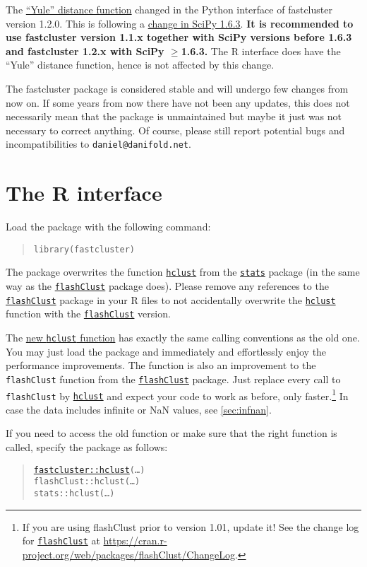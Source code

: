 \documentclass[fontsize=10pt,paper=letter,BCOR=-6mm,DIV=8]{scrartcl}
\newcommand*\q{\textquotesingle}
\newcommand*\hclust{\href{https://stat.ethz.ch/R-manual/R-patched/library/stats/html/hclust.html}{\texttt{hclust}}}
\newcommand*\stats{\href{https://stat.ethz.ch/R-manual/R-patched/library/stats/html/00Index.html}{\texttt{stats}}}
\newcommand*\flashClustPack{\href{https://CRAN.R-project.org/package=flashClust}{\texttt{flashClust}}}
\begin{document}
The \hyperref[yule]{“Yule” distance function} changed in the Python interface of fastcluster version 1.2.0. This is following a \href{https://github.com/scipy/scipy/commit/3b22d1da98dc1b5f64bc944c21f398d4ba782bce}{change in SciPy 1.6.3}. \textbf{It is recommended to use fastcluster version 1.1.x together with SciPy versions before 1.6.3 and fastcluster 1.2.x with SciPy $\geq{}$1.6.3.} The R interface does have the “Yule” distance function, hence is not affected by this change.

The fastcluster package is considered stable and will undergo few changes from now on. If some years from now there have not been any updates, this does not necessarily mean that the package is unmaintained but maybe it just was not necessary to correct anything. Of course, please still report potential bugs and incompatibilities to \texttt{daniel@danifold.net}.

\tableofcontents

\section{The R interface}

Load the package with the following command:
\begin{quote}
  \texttt{library(\q fastcluster\q)}
\end{quote}

The package overwrites the function \hclust{} from the \stats{} package (in the same
way as the \flashClustPack{} package does). Please remove any references to the
\flashClustPack{} package in your R files to not accidentally overwrite the \hclust{}
function with the \flashClustPack{} version.

The \hyperref[hclust]{new \texttt{hclust} function} has exactly the same calling conventions as the old one. You may just load the package and immediately and effortlessly enjoy the performance improvements. The function is also an improvement to the \texttt{flashClust} function from the \flashClustPack{} package. Just replace every call to \texttt{flashClust} by \hyperref[hclust]{\texttt{hclust}} and expect your code to work as before, only faster.\footnote{If you are using flashClust prior to version 1.01, update it! See the change log for \flashClustPack{} at \url{https://cran.r-project.org/web/packages/flashClust/ChangeLog}.} In case the data includes infinite or NaN values, see \autoref{sec:infnan}.

If you need to access the old function or make sure that the right function is
called, specify the package as follows:
\begin{quote}
    \texttt{\hyperref[hclust]{fastcluster::hclust}(…)}\\
    \texttt{flashClust::hclust(…)}\\
    \texttt{stats::hclust(…)}
\end{quote}
\end{document}
